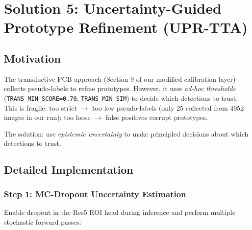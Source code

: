 \documentclass[11pt,a4paper]{article}
\begin{document}
\section{Solution 5: Uncertainty-Guided Prototype Refinement (UPR-TTA)}
\label{sec:uprtta}

\subsection{Motivation}

The transductive PCB approach (Section 9 of our modified calibration layer) collects pseudo-labels to refine prototypes. However, it uses \textit{ad-hoc thresholds} (\texttt{TRANS\_MIN\_SCORE=0.70}, \texttt{TRANS\_MIN\_SIM}) to decide which detections to trust. This is fragile: too strict $\rightarrow$ too few pseudo-labels (only 25 collected from 4952 images in our run); too loose $\rightarrow$ false positives corrupt prototypes.

The solution: use \textit{epistemic uncertainty} to make principled decisions about which detections to trust.

\subsection{Detailed Implementation}

\subsubsection{Step 1: MC-Dropout Uncertainty Estimation}

Enable dropout in the Res5 ROI head during inference and perform multiple stochastic forward passes:
\end{document}
